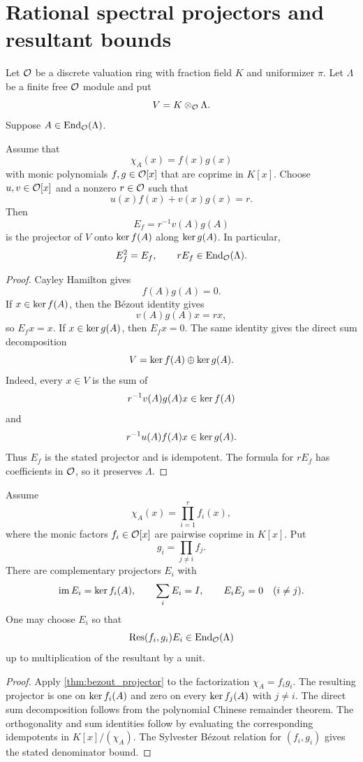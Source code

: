 \section{Rational spectral projectors and resultant bounds}\label{sec:resultant}

Let ${\mathcal O}$ be a discrete valuation ring with fraction field $K$ and uniformizer $\pi$.  Let $\Lambda$ be a finite free ${\mathcal O}$ module and put
\[
V=K\otimes_{{\mathcal O}}\Lambda.
\]
Suppose $A\in\operatorname{End}_{{\mathcal O}}(\Lambda)$.

\begin{theorem}\label{thm:bezout_projector}
Assume that
\[
\chi_A(x)=f(x)g(x)
\]
with monic polynomials $f,g\in{\mathcal O}[x]$ that are coprime in $K[x]$.  Choose $u,v\in{\mathcal O}[x]$ and a nonzero $r\in{\mathcal O}$ such that
\[
u(x)f(x)+v(x)g(x)=r.
\]
Then
\[
E_f=r^{-1}v(A)g(A)
\]
is the projector of $V$ onto $\operatorname{ker} f(A)$ along $\operatorname{ker} g(A)$.  In particular,
\[
E_f^2=E_f,
\qquad
rE_f\in\operatorname{End}_{{\mathcal O}}(\Lambda).
\]
\end{theorem}

\begin{proof}
Cayley Hamilton gives
\[
f(A)g(A)=0.
\]
If $x\in\operatorname{ker} f(A)$, then the Bézout identity gives
\[
v(A)g(A)x=rx,
\]
so $E_fx=x$.  If $x\in\operatorname{ker} g(A)$, then $E_fx=0$.  The same identity gives the direct sum decomposition
\[
V=\operatorname{ker} f(A)\oplus\operatorname{ker} g(A).
\]
Indeed, every $x\in V$ is the sum of
\[
r^{-1}v(A)g(A)x\in\operatorname{ker} f(A)
\]
and
\[
r^{-1}u(A)f(A)x\in\operatorname{ker} g(A).
\]
Thus $E_f$ is the stated projector and is idempotent.  The formula for $rE_f$ has coefficients in ${\mathcal O}$, so it preserves $\Lambda$.
\end{proof}

\begin{theorem}\label{thm:several_projectors}
Assume
\[
\chi_A(x)=\prod_{i=1}^rf_i(x),
\]
where the monic factors $f_i\in{\mathcal O}[x]$ are pairwise coprime in $K[x]$.  Put
\[
g_i=\prod_{j\ne i}f_j.
\]
There are complementary projectors $E_i$ with
\[
\operatorname{im} E_i=\operatorname{ker} f_i(A),
\qquad
\sum_iE_i=I,
\qquad
E_iE_j=0
\quad(i\ne j).
\]
One may choose $E_i$ so that
\[
\operatorname{Res}(f_i,g_i)E_i\in\operatorname{End}_{{\mathcal O}}(\Lambda)
\]
up to multiplication of the resultant by a unit.
\end{theorem}

\begin{proof}
Apply \cref{thm:bezout_projector} to the factorization $\chi_A=f_ig_i$.  The resulting projector is one on $\operatorname{ker} f_i(A)$ and zero on every $\operatorname{ker} f_j(A)$ with $j\ne i$.  The direct sum decomposition follows from the polynomial Chinese remainder theorem.  The orthogonality and sum identities follow by evaluating the corresponding idempotents in $K[x]/(\chi_A)$.  The Sylvester Bézout relation for $(f_i,g_i)$ gives the stated denominator bound.
\end{proof}

